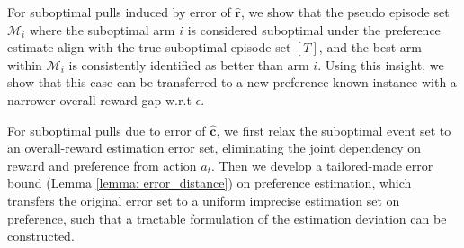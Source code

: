 For suboptimal pulls induced by error of $\boldsymbol{\hat{r}}$, 
we show that the pseudo episode set $\mathcal{M}_i$ where the suboptimal arm $i$ is considered suboptimal under the preference estimate align with the true suboptimal episode set $[T]$, and the best arm within $\mathcal{M}_i$ is consistently identified as better than arm $i$. Using this insight, we show that this case can be transferred to a new preference known instance with a narrower overall-reward gap w.r.t $\epsilon$. 



For suboptimal pulls due to error of $\boldsymbol{\hat{c}}$, 
we first relax the suboptimal event set to an overall-reward estimation error set, eliminating the joint dependency on reward and preference from action $a_t$. Then we develop a tailored-made error bound (Lemma \ref{lemma: error_distance}) on preference estimation, which transfers the original error set to a uniform imprecise estimation set on preference, such that a tractable formulation of the estimation deviation can be constructed.



